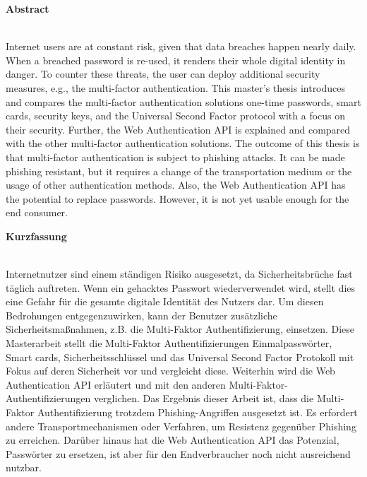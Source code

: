 \thispagestyle{noheader}
\setlength{\columnsep}{1cm}

{}

\begin{large}
	\textbf{Abstract} \\ \\
\end{large}
Internet users are at constant risk, given that data breaches happen nearly daily. When a breached password is re-used, it renders their whole digital identity in danger. To counter these threats, the user can deploy additional security measures, e.g., the multi-factor authentication. This master's thesis introduces and compares the multi-factor authentication solutions one-time passwords, smart cards, security keys, and the Universal Second Factor protocol with a focus on their security. Further, the Web Authentication API is explained and compared with the other multi-factor authentication solutions. The outcome of this thesis is that multi-factor authentication is subject to phishing attacks. It can be made phishing resistant, but it requires a change of the transportation medium or the usage of other authentication methods. Also, the Web Authentication API has the potential to replace passwords. However, it is not yet usable enough for the end consumer.


\addvspace{0.7cm}

\begin{large}
	\textbf{Kurzfassung} \\ \\
\end{large}
Internetnutzer sind einem ständigen Risiko ausgesetzt, da Sicherheitsbrüche fast täglich auftreten. Wenn ein gehacktes Passwort wiederverwendet wird, stellt dies eine Gefahr für die gesamte digitale Identität des Nutzers dar. Um diesen Bedrohungen entgegenzuwirken, kann der Benutzer zusätzliche Sicherheitsmaßnahmen, z.B. die Multi-Faktor Authentifizierung, einsetzen. Diese Masterarbeit stellt die Multi-Faktor Authentifizierungen Einmalpasswörter, Smart cards, Sicherheitsschlüssel und das Universal Second Factor Protokoll mit Fokus auf deren Sicherheit vor und vergleicht diese. Weiterhin wird die Web Authentication API erläutert und mit den anderen Multi-Faktor-Authentifizierungen verglichen. Das Ergebnis dieser Arbeit ist, dass die Multi-Faktor Authentifizierung trotzdem Phishing-Angriffen ausgesetzt ist. Es erfordert andere Transportmechanismen oder Verfahren, um Resistenz gegenüber Phishing zu erreichen. Darüber hinaus hat die Web Authentication API das Potenzial, Passwörter zu ersetzen, ist aber für den Endverbraucher noch nicht ausreichend nutzbar.


\newpage